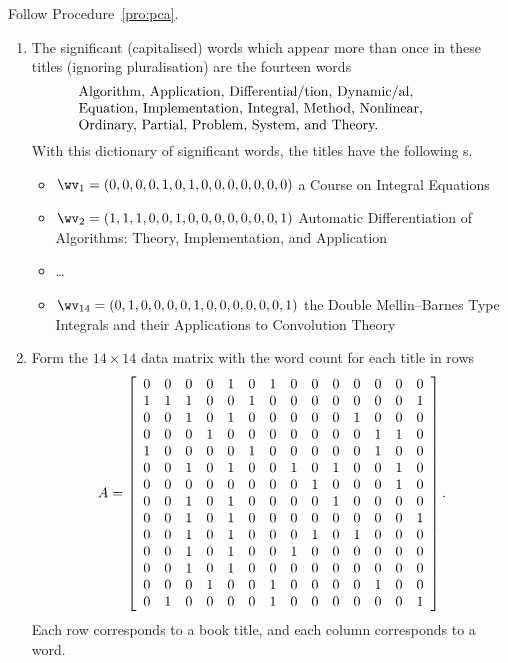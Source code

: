 Follow Procedure~\ref{pro:pca}.
\begin{enumerate}
\item  The significant (capitalised) words which appear more than once in these titles (ignoring pluralisation) are the fourteen words
\begin{equation}
\parbox{0.8\linewidth}{\raggedright
Algorithm,
Application,
Differential/tion,
Dynamic/al,
Equation,
Implementation,
Integral,
Method,
Nonlinear,
Ordinary,
Partial,
Problem,
System, and
Theory.}
\label{eq:lsidict}
\end{equation}
With this dictionary of significant words, the titles have the following s.
\begin{itemize}
\item \(\wv_1=(0,0,0,0,1,0,1,0,0,0,0,0,0,0)\) a Course on Integral Equations
\item \(\wv_2=(1,1,1,0,0,1,0,0,0,0,0,0,0,1)\) Automatic Differentiation of Algorithms: Theory, Implementation, and Application
\item \ldots
\item \(\wv_{14}=(0,1,0,0,0,0,1,0,0,0,0,0,0,1)\) the Double Mellin--Barnes Type Integrals and their Applications to Convolution Theory
\end{itemize}


\item Form the \(14\times14\) data matrix with the word count for each title in rows 
\begin{equation*}
A=\left[\begin{array}{*{14}c}
0&0&0&0&1&0&1&0&0&0&0&0&0&0 \\
1&1&1&0&0&1&0&0&0&0&0&0&0&1 \\
0&0&1&0&1&0&0&0&0&0&1&0&0&0 \\
0&0&0&1&0&0&0&0&0&0&0&1&1&0 \\
1&0&0&0&0&1&0&0&0&0&0&1&0&0 \\
0&0&1&0&1&0&0&1&0&1&0&0&1&0 \\
0&0&0&0&0&0&0&0&1&0&0&0&1&0 \\
0&0&1&0&1&0&0&0&0&1&0&0&0&0 \\
0&0&1&0&1&0&0&0&0&0&0&0&0&1 \\
0&0&1&0&1&0&0&0&1&0&1&0&0&0 \\
0&0&1&0&1&0&0&1&0&0&0&0&0&0 \\
0&0&1&0&1&0&0&0&0&0&0&0&0&0 \\
0&0&0&1&0&0&1&0&0&0&0&1&0&0 \\
0&1&0&0&0&0&1&0&0&0&0&0&0&1
\end{array}\right].
\end{equation*}
Each row corresponds to a book title, and each column corresponds to a word.
\setbox\ajrqrbox\hbox{}%
\marginpar{\usebox{\ajrqrbox\\[2ex]}}%



\end{enumerate}

